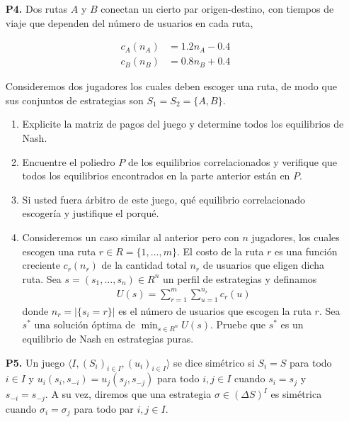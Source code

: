 \documentclass[11pt, spanish]{article}
\theoremstyle{plain}
\begin{document}
\begin{itemize}
  \item[\textbf{P4.}] 
    Dos rutas $A$ y $B$ conectan un cierto par 
  origen-destino, con tiempos de viaje que dependen del número de
  usuarios en cada ruta,

  \begin{align*}
    c_A(n_A) & = 1.2n_A - 0.4\\
    c_B(n_B) & = 0.8n_B + 0.4
  \end{align*}

  Consideremos dos jugadores los cuales deben escoger una ruta, de
  modo que sus conjuntos de estrategias son $S_1=S_2=\{A,B\}$.
  \begin{enumerate}
    \item Explicite la matriz de pagos del juego y determine todos
      los equilibrios de Nash.
    \item Encuentre el poliedro $P$ de los equilibrios correlacionados
      y verifique que todos los equilibrios encontrados en la parte
      anterior están en $P$.
    \item Si usted fuera árbitro de este juego, qu\'e equilibrio
      correlacionado escogería y justifique el porqu\'e.
    \item Consideremos un caso similar al anterior pero con $n$
      jugadores, los cuales escogen una ruta $r\in R=\{1,\dots,m\}$.
      El costo de la ruta $r$ es una función creciente $c_r(n_r)$ de
      la cantidad total $n_r$ de usuarios que eligen dicha ruta. Sea
      $s=(s_1,\dots,s_n)\in R^n$ un perfil de estrategias y definamos
      \begin{align*}
	U(s)= \sum_{r=1}^m \sum_{u=1}^{n_r} c_r(u)
      \end{align*}
      donde $n_r=|\{ s_i=r\}|$ es el número de usuarios que escogen
      la ruta $r$. Sea $s^*$ una solución óptima de $\min_{s\in R^n}
      U(s)$. Pruebe que $s^*$ es un equilibrio de Nash en estrategias
      puras.
  \end{enumerate}

\item[\textbf{P5.}]
  Un juego $\langle I, (S_i)_{i\in I}, (u_i)_{i\in I} \rangle$ se
  dice sim\'etrico si $S_i =S$ para todo $i\in I$ y $u_i(s_i,s_{-i})=
  u_j(s_j,s_{-j})$ para todo $i,j\in I$ cuando $s_i=s_j$ y $s_{-i}=s_{-j}$.
  A su vez, diremos que una estrategia $\sigma\in (\Delta S)^{I}$ es
  sim\'etrica cuando $\sigma_i= \sigma_j$ para todo par $i,j\in I$.


\end{itemize}
\end{document}
